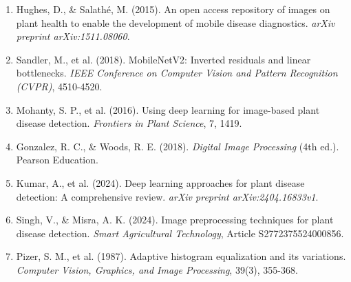 \documentclass[12pt,a4paper]{article}
\begin{document}
\begin{enumerate}
    \item \label{ref:1} Hughes, D., \& Salathé, M. (2015). An open access repository of images on plant health to enable the development of mobile disease diagnostics. \textit{arXiv preprint arXiv:1511.08060}.
    
    \item \label{ref:2} Sandler, M., et al. (2018). MobileNetV2: Inverted residuals and linear bottlenecks. \textit{IEEE Conference on Computer Vision and Pattern Recognition (CVPR)}, 4510-4520.
    
    \item \label{ref:3} Mohanty, S. P., et al. (2016). Using deep learning for image-based plant disease detection. \textit{Frontiers in Plant Science}, 7, 1419.
    
    \item \label{ref:4} Gonzalez, R. C., \& Woods, R. E. (2018). \textit{Digital Image Processing} (4th ed.). Pearson Education.
    
    \item \label{ref:5} Kumar, A., et al. (2024). Deep learning approaches for plant disease detection: A comprehensive review. \textit{arXiv preprint arXiv:2404.16833v1}.
    
    \item \label{ref:6} Singh, V., \& Misra, A. K. (2024). Image preprocessing techniques for plant disease detection. \textit{Smart Agricultural Technology}, Article S2772375524000856.
    
    \item \label{ref:7} Pizer, S. M., et al. (1987). Adaptive histogram equalization and its variations. \textit{Computer Vision, Graphics, and Image Processing}, 39(3), 355-368.
\end{enumerate}
\end{document}

